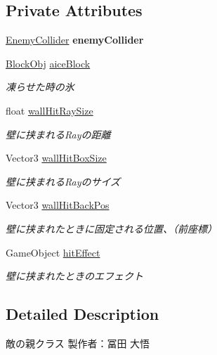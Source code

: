 \subsection*{Private Attributes}
\begin{DoxyCompactItemize}
\item 
\mbox{\label{class_enemy_ab496e2e7f17d369973401c28fd84309b}} 
\hyperlink{class_enemy_collider}{Enemy\+Collider} {\bfseries enemy\+Collider}
\item 
\hyperlink{class_block_obj}{Block\+Obj} \hyperlink{class_enemy_ad1892bec7a3cf7a663b68ae349b6e2b1}{aice\+Block}
\begin{DoxyCompactList}\small\item\em 凍らせた時の氷 \end{DoxyCompactList}\item 
float \hyperlink{class_enemy_a8b7dc2553eb9f3a3a4bdcbe0dc390ede}{wall\+Hit\+Ray\+Size}
\begin{DoxyCompactList}\small\item\em 壁に挟まれる\+Rayの距離 \end{DoxyCompactList}\item 
Vector3 \hyperlink{class_enemy_a6aa9348e5d07b274d08d045a8562f511}{wall\+Hit\+Box\+Size}
\begin{DoxyCompactList}\small\item\em 壁に挟まれる\+Rayのサイズ \end{DoxyCompactList}\item 
Vector3 \hyperlink{class_enemy_a1a34acbbd165cfe6c567710b8d2ab3ef}{wall\+Hit\+Back\+Pos}
\begin{DoxyCompactList}\small\item\em 壁に挟まれたときに固定される位置、（前座標） \end{DoxyCompactList}\item 
Game\+Object \hyperlink{class_enemy_a7cb4998f3076e0f9ec871507d54bfcfe}{hit\+Effect}
\begin{DoxyCompactList}\small\item\em 壁に挟まれたときのエフェクト \end{DoxyCompactList}\end{DoxyCompactItemize}


\subsection{Detailed Description}
敵の親クラス 製作者：冨田 大悟 



